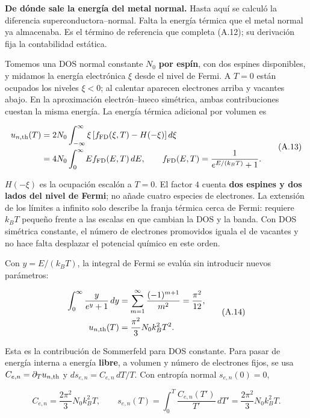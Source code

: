 \documentclass[
  spanish,
  10pt,
  a4paper,
]{article}
\begin{document}
\textbf{De dónde sale la energía del metal normal.} Hasta aquí se
calculó la diferencia superconductora--normal. Falta la energía térmica
que el metal normal ya almacenaba. Es el término de referencia que
completa (A.12); su derivación fija la contabilidad estática.

Tomemos una DOS normal constante \(N_0\) \textbf{por espín}, con dos
espines disponibles, y midamos la energía electrónica \(\xi\) desde el
nivel de Fermi. A \(T=0\) están ocupados los niveles \(\xi<0\); al
calentar aparecen electrones arriba y vacantes abajo. En la aproximación
electrón--hueco simétrica, ambas contribuciones cuestan la misma
energía. La energía térmica adicional por volumen es

\[
\begin{aligned}
u_{n,\rm th}(T)
&=2N_0\int_{-\infty}^{\infty}
\xi\,[f_{\rm FD}(\xi,T)-H(-\xi)]\,d\xi\\
&=4N_0\int_0^\infty E f_{\rm FD}(E,T)\,dE,
\qquad f_{\rm FD}(E,T)=\frac{1}{e^{E/(k_BT)}+1}.
\end{aligned}
\tag{A.13}
\]

\(H(-\xi)\) es la ocupación escalón a \(T=0\). El factor \(4\) cuenta
\textbf{dos espines y dos lados del nivel de Fermi}; no añade cuatro
especies de electrones. La extensión de los límites a infinito solo
describe la franja térmica cerca de Fermi: requiere \(k_BT\) pequeño
frente a las escalas en que cambian la DOS y la banda. Con DOS simétrica
constante, el número de electrones promovidos iguala el de vacantes y no
hace falta desplazar el potencial químico en este orden.

Con \(y=E/(k_BT)\), la integral de Fermi se evalúa sin introducir nuevos
parámetros:

\[
\begin{aligned}
\int_0^\infty\frac{y}{e^y+1}\,dy
&=\sum_{m=1}^{\infty}\frac{(-1)^{m+1}}{m^2}
=\frac{\pi^2}{12},\\
u_{n,\rm th}(T)&=\frac{\pi^2}{3}N_0k_B^2T^2.
\end{aligned}
\tag{A.14}
\]

Esta es la contribución de Sommerfeld para DOS constante. Para pasar de
energía interna a energía \textbf{libre}, a volumen y número de
electrones fijos, se usa \(C_{e,n}=\partial_Tu_{n,\rm th}\) y
\(ds_{e,n}=C_{e,n}\,dT/T\). Con entropía normal \(s_{e,n}(0)=0\),

\[
C_{e,n}=\frac{2\pi^2}{3}N_0k_B^2T,
\qquad
s_{e,n}(T)=\int_0^T\frac{C_{e,n}(T')}{T'}\,dT'
=\frac{2\pi^2}{3}N_0k_B^2T.
\tag{A.15}
\]
\end{document}
